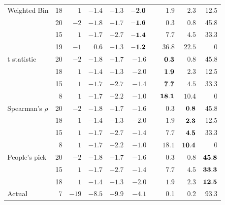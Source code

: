 \documentclass[12]{report}
\begin{document}
\begin{table}[hbt]
\begin{tabular}{l r rrrr r rrr}
Weighted Bin & 18 & $1$ & $-1.4$ & $-1.3$ & $\bf -2.0$ & & $1.9$ & $2.3$ & 12.5 \\[-0.5ex]
		 & 20 & $-2$ & $-1.8$ & $-1.7$ & $\bf -1.6$ & & $0.3$ & $0.8$ & 45.8 \\[-0.5ex]
 		& 15 & $1$ & $-1.7$ & $-2.7$ & $\bf -1.4$ & & $7.7$ & $4.5$ & 33.3 \\[-0.5ex]
 		& 19 & $-1$ & $0.6$ & $-1.3$ & $\bf -1.2$ & & $36.8$ & $22.5$ & 0\\[1ex]

t statistic  & 20 & $-2$ & $-1.8$ & $-1.7$ & $ -1.6$ & & $\bf 0.3$ & $0.8$ & 45.8 \\[-0.5ex]
		  & 18 & $1$ & $-1.4$ & $-1.3$ & $ -2.0$ & & $\bf 1.9$ & $2.3$ & 12.5\\[-0.5ex]
		& 15 & $1$ & $-1.7$ & $-2.7$ & $ -1.4$ & & $\bf 7.7$ & $4.5$ & 33.3 \\[-0.5ex]
 		 & 8 & $ 1$ & $-1.7$ & $-2.2$ & $-1.0$ & & $\bf18.1$ & $10.4$ & 0 \\[1ex]

Spearman's $\rho$  & 20 & $-2$ & $-1.8$ & $-1.7$ & $ -1.6$ & & $0.3$ & $\bf 0.8$ & 45.8 \\[-0.5ex]
		   & 18 & $1$ & $-1.4$ & $-1.3$ & $ -2.0$ & & $1.9$ & $\bf 2.3$ & 12.5 \\[-0.5ex]
		 & 15 & $1$ & $-1.7$ & $-2.7$ & $ -1.4$ & & $7.7$ & $\bf 4.5$ & 33.3 \\[-0.5ex]
 		 & 8 & $ 1$ & $-1.7$ & $-2.2$ & $-1.0$ & & $18.1$ & $\bf 10.4$ & 0\\[1ex]

People's pick  	& 20 & $-2$ & $-1.8$ & $-1.7$ & $ -1.6$ & & $0.3$ & $0.8$ & $\bf 45.8$ \\[-0.5ex]  
		 & 15 & $1$ & $-1.7$ & $-2.7$ & $ -1.4$ & & $7.7$ & $4.5$ & $\bf 33.3$ \\[-0.5ex]
		  & 18 & $1$ & $-1.4$ & $-1.3$ & $ -2.0$ & & $1.9$ & $2.3$ & $\bf 12.5$ \\[1ex]

\hline
Actual & 7  & $-19$ & $-8.5$ & $-9.9$ & $-4.1$ & & 0.1 & 0.2 & 93.3\\[1ex]
\hline
\end{tabular}
\label{sca_table}
\end{table}
\end{document}
